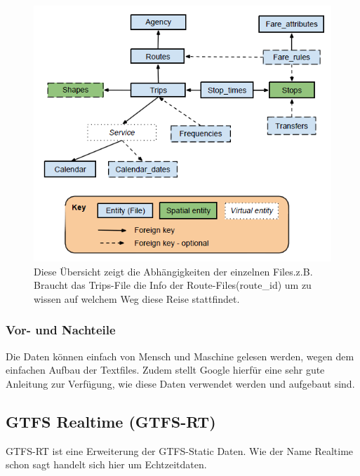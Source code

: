 \begin{figure}[]
	\centering
	\includegraphics[scale=0.75]{img/GTFS_data_model_diagram.png}
 	\caption{Diese Übersicht zeigt die Abhängigkeiten der einzelnen Files.z.B. Braucht das Trips-File die Info der Route-Files(route\_id) um zu wissen auf welchem Weg diese Reise stattfindet.  \cite{gtfsUebersicht}}
	\label{fig:gtfs-uebersicht}
\end{figure}

 

\subsubsection{Vor- und Nachteile}
\label{sec:gtfs-vornachteile}
Die Daten können einfach von Mensch und Maschine gelesen werden, wegen dem einfachen Aufbau der Textfiles. Zudem stellt Google hierfür eine sehr gute Anleitung zur Verfügung, wie diese Daten verwendet werden und aufgebaut sind.

\subsection{GTFS Realtime (GTFS-RT)}
\label{sec:gtfs-rt}
GTFS-RT ist eine Erweiterung der GTFS-Static Daten. Wie der Name Realtime schon sagt handelt sich hier um Echtzeitdaten. 
